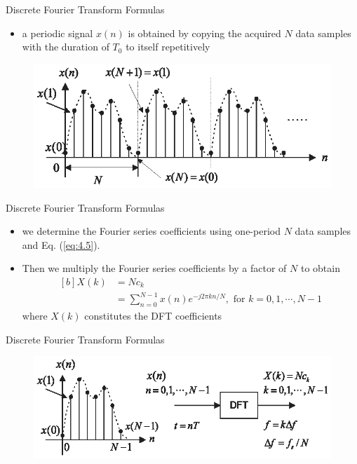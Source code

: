 \documentclass[pdflatex,compress,mathserif]{beamer}
\begin{document}
\begin{frame}{Discrete Fourier Transform Formulas}
    \begin{itemize}
        \item a periodic signal $x(n)$ is obtained by copying the acquired $N$ data samples with the duration of $T_0$ to itself repetitively
    \end{itemize}
    \begin{figure}
        \includegraphics[width=\linewidth]{fig/fig.4.06b}
    \end{figure}
\end{frame}

\begin{frame}{Discrete Fourier Transform Formulas}
    \begin{itemize}
        \item we determine the Fourier series coefficients using one-period $N$ data samples
        and Eq. (\ref{eq:4.5}).
        \item Then we multiply the Fourier series coefficients by a factor of $N$ to obtain
        \begin{equation}
            \begin{aligned}[b]
                X(k) &= Nc_k \\
                &= \sum_{n=0}^{N-1} x(n)e^{-j2\pi kn / N},\text{ for } k = 0,1, \cdots, N-1
            \end{aligned}
        \end{equation}
        where $X(k)$ constitutes the DFT coefficients
    \end{itemize}
\end{frame}

\begin{frame}{Discrete Fourier Transform Formulas}
    \begin{figure}
        \includegraphics[width=\linewidth]{fig/fig.4.06c}
    \end{figure}
\end{frame}
\end{document}
